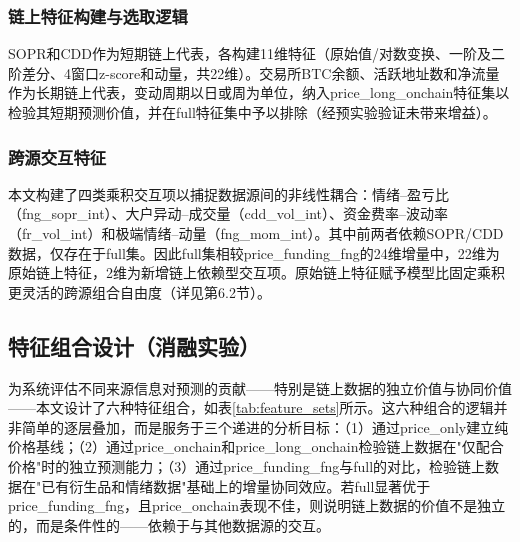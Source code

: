 \documentclass[12pt,a4paper]{ctexart}
\begin{document}
\subsubsection{链上特征构建与选取逻辑}

SOPR和CDD作为短期链上代表，各构建11维特征（原始值/对数变换、一阶及二阶差分、4窗口z-score和动量，共22维）。交易所BTC余额、活跃地址数和净流量作为长期链上代表，变动周期以日或周为单位，纳入price\_long\_onchain特征集以检验其短期预测价值，并在full特征集中予以排除（经预实验验证未带来增益）。

\subsubsection{跨源交互特征}

本文构建了四类乘积交互项以捕捉数据源间的非线性耦合：情绪--盈亏比（fng\_sopr\_int）、大户异动--成交量（cdd\_vol\_int）、资金费率--波动率（fr\_vol\_int）和极端情绪--动量（fng\_mom\_int）。其中前两者依赖SOPR/CDD数据，仅存在于full集。因此full集相较price\_funding\_fng的24维增量中，22维为原始链上特征，2维为新增链上依赖型交互项。原始链上特征赋予模型比固定乘积更灵活的跨源组合自由度（详见第6.2节）。

\subsection{特征组合设计（消融实验）}

为系统评估不同来源信息对预测的贡献——特别是链上数据的独立价值与协同价值——本文设计了六种特征组合，如表\ref{tab:feature_sets}所示。这六种组合的逻辑并非简单的逐层叠加，而是服务于三个递进的分析目标：（1）通过price\_only建立纯价格基线；（2）通过price\_onchain和price\_long\_onchain检验链上数据在"仅配合价格"时的独立预测能力；（3）通过price\_funding\_fng与full的对比，检验链上数据在"已有衍生品和情绪数据"基础上的增量协同效应。若full显著优于price\_funding\_fng，且price\_onchain表现不佳，则说明链上数据的价值不是独立的，而是条件性的——依赖于与其他数据源的交互。
\end{document}
